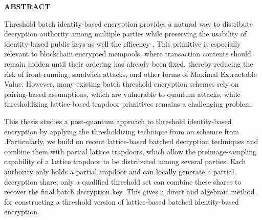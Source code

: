 \documentclass[../main.tex]{subfiles}
\begin{document}
    \begin{center}
        \Large{\textbf{ABSTRACT}}
    \end{center}
    
    \vspace{1cm}
    
    \noindent Threshold batch identity-based encryption provides a natural way to distribute decryption authority among multiple parties while preserving the usability of identity-based public keys as well the efficency . This primitive is especially relevant to blockchain encrypted mempools, where transaction contents should remain hidden until their ordering has already been fixed, thereby reducing the risk of front-running, sandwich attacks, and other forms of Maximal Extractable Value. However, many existing batch threshold encryption schemes rely on pairing-based assumptions, which are vulnerable to quantum attacks, while thresholdizing lattice-based trapdoor primitives remains a challenging problem.

This thesis studies a post-quantum approach to threshold identity-based encryption by applying the thresholdizing technique from \cite{AC:ALLW25} on schemce from \cite{EPRINT:BonLauTas25}.Particularly, we build on recent lattice-based batched decryption techniques and combine them with partial lattice trapdoors, which allow the preimage-sampling capability of a lattice trapdoor to be distributed among several parties. Each authority only holds a partial trapdoor and can locally generate a partial decryption share; only a qualified threshold set can combine these shares to recover the final batch decryption key. This gives a direct and algebraic method for constructing a threshold version of lattice-based batched identity-based encryption.
\end{document}
